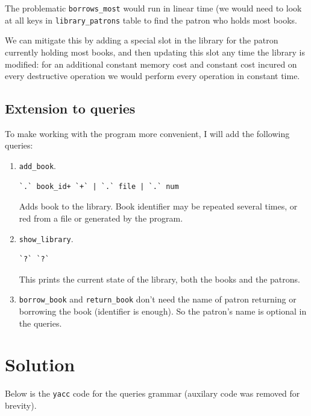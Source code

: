\documentclass[11pt]{article}
\begin{document}
The problematic \texttt{borrows\_most} would run in linear time (we would need to
look at all keys in \texttt{library\_patrons} table to find the patron who holds most
books.

We can mitigate this by adding a special slot in the library for the patron
currently holding most books, and then updating this slot any time the
library is modified: for an additional constant memory cost and constant cost
incured on every destructive operation we would perform every operation in
constant time.

\subsection{Extension to queries}
\label{sec-2-3}
To make working with the program more convenient, I will add the following
queries:
\begin{enumerate}
\item \texttt{add\_book}.
\begin{verbatim}
`.` book_id+ `+` | `.` file | `.` num
\end{verbatim}
Adds book to the library.  Book identifier may be repeated several times,
or red from a file or generated by the program.
\item \texttt{show\_library}.
\begin{verbatim}
`?` `?`
\end{verbatim}
This prints the current state of the library, both the books and the
patrons.
\item \texttt{borrow\_book} and \texttt{return\_book} don't need the name of patron returning or
borrowing the book (identifier is enough).  So the patron's name is
optional in the queries.
\end{enumerate}

\section{Solution}
\label{sec-3}
Below is the \texttt{yacc} code for the queries grammar (auxilary code was removed
for brevity).
\end{document}
